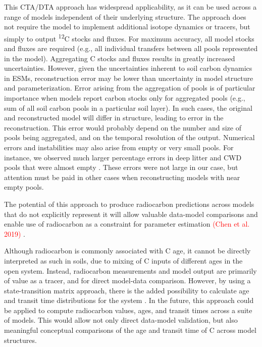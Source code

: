 \documentclass[11pt,a4paper]{article}
\newcommand{\red}[1]{\textcolor{red}{#1}}
\begin{document}
This CTA/DTA approach has widespread applicability, as it can be used across a range of models independent of their underlying structure. The approach does not require the model to implement additional isotope dynamics or tracers, but simply to output \textsuperscript{12}C stocks and fluxes. For maximum accuracy, all model stocks and fluxes are required (e.g., all individual transfers between all pools represented in the model). Aggregating C stocks and fluxes results in greatly increased uncertainties. However, given the uncertainties inherent to soil carbon dynamics in ESMs, reconstruction error may be lower than uncertainty in model structure and parameterization. Error arising from the aggregation of pools is of particular importance when models report carbon stocks only for aggregated pools (e.g., sum of all soil carbon pools in a particular soil layer). In such cases, the original and reconstructed model will differ in structure, leading to error in the reconstruction. This error would probably depend on the number and size of pools being aggregated, and on the temporal resolution of the output. Numerical errors and instabilities may also arise from empty or very small pools. For instance, we observed much larger percentage errors in deep litter and CWD pools that were almost empty . These errors were not large in our case, but attention must be paid in other cases when reconstructing models with near empty pools.


The potential of this approach to produce radiocarbon predictions across models that do not explicitly represent it will allow valuable data-model comparisons and enable use of radiocarbon as a constraint for parameter estimation \red{(Chen et al. 2019)} .

Although radiocarbon is commonly associated with C age, it cannot be directly interpreted as such in soils, due to mixing of C inputs of different ages in the open system. Instead, radiocarbon measurements and model output are primarily of value as a tracer, and for direct model-data comparison. However, by using a state-transition matrix approach, there is the added possibility to calculate age and transit time distributions for the system \citep{Metzler2018PNAS}. In the future, this approach could be applied to compute radiocarbon values, ages, and transit times across a suite of models. This would allow not only direct data-model validation, but also meaningful conceptual comparisons of the age and transit time of C across model structures. 
\end{document}
